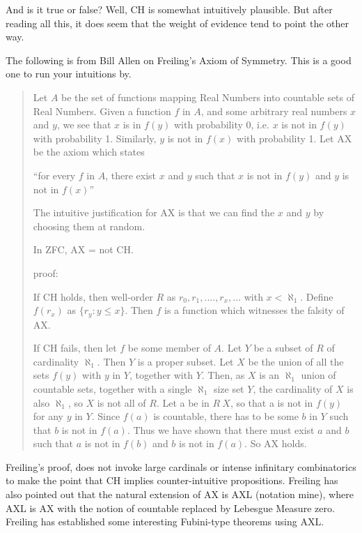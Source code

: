 And is it true or false?  Well, CH is somewhat intuitively plausible.
But after reading all this, it does seem that the weight of evidence
tend to point the other way.

The following is from Bill Allen on Freiling's Axiom of Symmetry.  This
is a good one to run your intuitions by.

\begin{quote}
  Let $A$ be the set of functions mapping Real Numbers into countable
  sets of Real Numbers.  Given a function $f$ in $A$, and some arbitrary
  real numbers $x$ and $y$, we see that $x$ is in $f(y)$ with
  probability 0, i.e. $x$ is not in $f(y)$ with probability 1.
  Similarly, $y$ is not in $f(x)$ with probability 1.  Let AX be the
  axiom which states

  ``for every $f$ in $A$, there exist $x$ and $y$ such that $x$ is not
  in $f(y)$ and $y$ is not in $f(x)$''

  The intuitive justification for AX is that we can find the $x$ and $y$
  by choosing them at random.

  In ZFC, AX = not CH.

  proof:

  If CH holds, then well-order $R$ as $r_0, r_1, .... , r_x, ...$ with
  $x < \aleph_1$.  Define $f(r_x)$ as $\{r_y : y \leq x\}$.  Then $f$ is
  a function which witnesses the falsity of AX.

  If CH fails, then let $f$ be some member of $A$.  Let $Y$ be a subset
  of $R$ of cardinality $\aleph_1$.  Then $Y$ is a proper subset.  Let
  $X$ be the union of all the sets $f(y)$ with $y$ in $Y$, together with
  $Y$.  Then, as $X$ is an $\aleph_1$ union of countable sets, together
  with a single $\aleph_1$ size set $Y$, the cardinality of $X$ is also
  $\aleph_1$, so $X$ is not all of $R$.  Let a be in $R \ X$, so that a
  is not in $f(y)$ for any $y$ in $Y$.  Since $f(a)$ is countable, there
  has to be some $b$ in $Y$ such that $b$ is not in $f(a)$.  Thus we
  have shown that there must exist $a$ and $b$ such that $a$ is not in
  $f(b)$ and $b$ is not in $f(a)$.  So AX holds.
\end{quote}

Freiling's proof, does not invoke large cardinals or intense infinitary
combinatorics to make the point that CH implies counter-intuitive
propositions.  Freiling has also pointed out that the natural extension
of AX is AXL (notation mine), where AXL is AX with the notion of
countable replaced by Lebesgue Measure zero.  Freiling has established
some interesting Fubini-type theorems using AXL.

